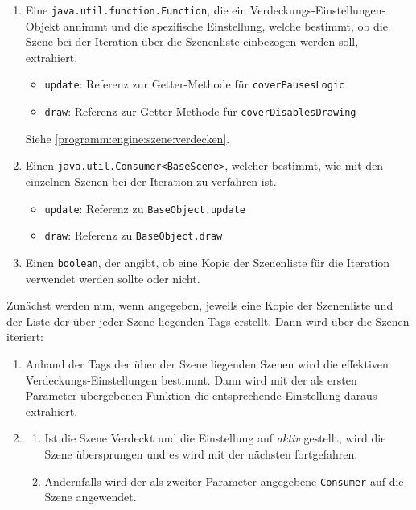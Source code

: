 \begin{sloppypar}
\begin{enumerate}
	\item Eine \texttt{java.util.function.Function}, die ein Verdeckungs-Einstellungen-Objekt
	      annimmt und die spezifische Einstellung, welche bestimmt, ob die Szene bei
	      der Iteration über die Szenenliste einbezogen werden soll, extrahiert.
	      \begin{itemize}
	          \item \texttt{update}: Referenz zur Getter-Methode für \texttt{coverPausesLogic}
	          \item \texttt{draw}: Referenz zur Getter-Methode für \texttt{coverDisablesDrawing}
	      \end{itemize}
	      Siehe \ref{programm:engine:szene:verdecken}.
	\item Einen \texttt{java.util.Consumer<BaseScene>}, welcher bestimmt, wie mit
	      den einzelnen Szenen bei der Iteration zu verfahren ist.
 	      \begin{itemize}
	      	\item \texttt{update}: Referenz zu \texttt{BaseObject.update}
	      	\item \texttt{draw}: Referenz zu \texttt{BaseObject.draw}
	      \end{itemize}
	\item Einen \texttt{boolean}, der angibt, ob eine Kopie der Szenenliste
	      für die Iteration verwendet werden sollte oder nicht.
\end{enumerate}

Zunächst werden nun, wenn angegeben, jeweils eine Kopie der Szenenliste und der
Liste der über jeder Szene liegenden Tags erstellt. Dann wird über die Szenen
iteriert:

\begin{enumerate}
	\item Anhand der Tags der über der Szene liegenden Szenen wird
	      die effektiven Verdeckungs-Einstellungen bestimmt. Dann wird
	      mit der als ersten Parameter übergebenen Funktion die entsprechende
	      Einstellung daraus extrahiert.
	\item \begin{enumerate}
		\item Ist die Szene Verdeckt und die Einstellung auf \textit{aktiv} gestellt,
		      wird die Szene übersprungen und es wird mit der nächsten fortgefahren.
		\item Andernfalls wird der als zweiter Parameter angegebene \texttt{Consumer}
		      auf die Szene angewendet.
	\end{enumerate}
\end{enumerate}



\end{sloppypar}
